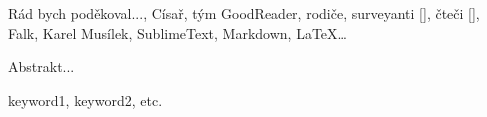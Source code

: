 \documentclass[12pt,oneside,final]{fithesis2}
\begin{document}
\FrontMatter
\ThesisTitlePage

\begin{ThesisDeclaration}
\DeclarationText
\AdvisorName
\end{ThesisDeclaration}

\begin{ThesisThanks}
Rád bych poděkoval..., Císař, tým GoodReader, rodiče, surveyanti [], čteči [], Falk, Karel Musílek, SublimeText, Markdown, LaTeX…
\end{ThesisThanks}

\begin{ThesisAbstract}
Abstrakt...
\end{ThesisAbstract}

\begin{ThesisKeyWords}
keyword1, keyword2, etc.
\end{ThesisKeyWords}

\MainMatter

\tableofcontents          %





\end{document}
